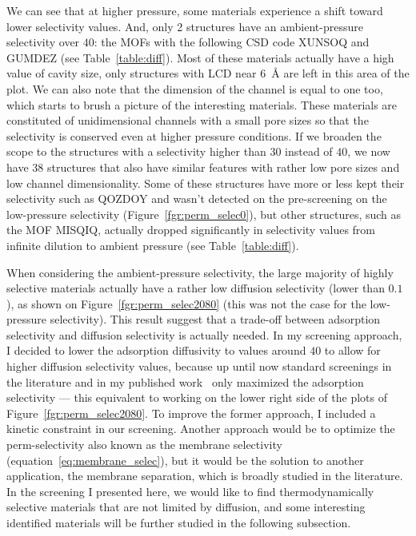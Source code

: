 \documentclass[main]{subfiles}
\begin{document}
We can see that at higher pressure, some materials experience a shift toward lower selectivity values. And, only 2 structures have an ambient-pressure selectivity over $40$: the MOFs with the following CSD code XUNSOQ\autocite{Abrahams_2014} and GUMDEZ\autocite{Yin_2014}  (see Table~\ref{table:diff}). Most of these materials actually have a high value of cavity size, only structures with LCD near \SI{6}{\angstrom} are left in this area of the plot. We can also note that the dimension of the channel is equal to one too, which starts to brush a picture of the interesting materials. These materials are constituted of unidimensional channels with a small pore sizes so that the selectivity is conserved even at higher pressure conditions. If we broaden the scope to the structures with a selectivity higher than $30$ instead of $40$, we now have 38 structures that also have similar features with rather low pore sizes and low channel dimensionality. Some of these structures have more or less kept their selectivity such as QOZDOY\autocite{Zhang_2001} and wasn't detected on the pre-screening on the low-pressure selectivity (Figure~\ref{fgr:perm_selec0}), but other structures, such as the MOF MISQIQ\autocite{Tong_2013}, actually dropped significantly in selectivity values from infinite dilution to ambient pressure (see Table~\ref{table:diff}). 

When considering the ambient-pressure selectivity, the large majority of highly selective materials actually have a rather low diffusion selectivity (lower than $0.1$), as shown on Figure~\ref{fgr:perm_selec2080} (this was not the case for the low-pressure selectivity). This result suggest that a trade-off between adsorption selectivity and diffusion selectivity is actually needed. In my screening approach, I decided to lower the adsorption diffusivity to values around $40$ to allow for higher diffusion selectivity values, because up until now standard screenings in the literature\autocite{Simon_2015,Chung_2019} and in my published work~\cite{Ren_2021} only maximized the adsorption selectivity --- this equivalent to working on the lower right side of the plots of Figure~\ref{fgr:perm_selec2080}. To improve the former approach, I included a kinetic constraint in our screening. Another approach would be to optimize the perm-selectivity also known as the membrane selectivity (equation~\ref{eq:membrane_selec}), but it would be the solution to another application, the membrane separation, which is broadly studied in the literature\autocite{Anderson_2017,Wang_2022}. In the screening I presented here, we would like to find thermodynamically selective materials that are not limited by diffusion, and some interesting identified materials will be further studied in the following subsection. 
\end{document}
